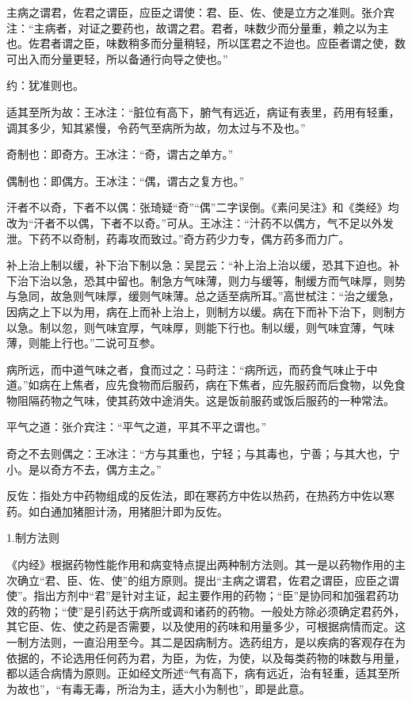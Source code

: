 \documentclass[draft,12pt]{ctexbook}
\begin{document}
\begin{jiaozhu}
	\item 主病之谓君，佐君之谓臣，应臣之谓使：君、臣、佐、使是立方之准则。张介宾注：“主病者，对证之要药也，故谓之君。君者，味数少而分量重，赖之以为主也。佐君者谓之臣，味数稍多而分量稍轻，所以匡君之不迨也。应臣者谓之使，数可出入而分量更轻，所以备通行向导之使也。”
	\item 约：犹准则也。
	\item 适其至所为故：王冰注：“脏位有高下，腑气有远近，病证有表里，药用有轻重，调其多少，知其紧慢，令药气至病所为故，勿太过与不及也。”
	\item 奇制也：即奇方。王冰注：“奇，谓古之单方。”
	\item 偶制也：即偶方。王冰注：“偶，谓古之复方也。”
	\item 汗者不以奇，下者不以偶：张琦疑“奇”“偶”二字误倒。《素问吴注》和《类经》均改为“汗者不以偶，下者不以奇。”可从。王冰注：“汁药不以偶方，气不足以外发泄。下药不以奇制，药毒攻而致过。”奇方药少力专，偶方药多而力广。
	\item 补上治上制以缓，补下治下制以急：吴昆云：“补上治上治以缓，恐其下迫也。补下治下治以急，恐其中留也。制急方气味薄，则力与缓等，制缓方而气味厚，则势与急同，故急则气味厚，缓则气味薄。总之适至病所耳。”高世栻注：“治之缓急，因病之上下以为用，病在上而补上治上，则制方以缓。病在下而补下治下，则制方以急。制以忽，则气味宜厚，气味厚，则能下行也。制以缓，则气味宜薄，气味薄，则能上行也。”二说可互参。
	\item 病所远，而中道气味之者，食而过之：马莳注：“病所远，而药食气味止于中道。”如病在上焦者，应先食物而后服药，病在下焦者，应先服药而后食物，以免食物阻隔药物之气味，使其药效中途消失。这是饭前服药或饭后服药的一种常法。
	\item 平气之道：张介宾注：“平气之道，平其不平之谓也。”
	\item 奇之不去则偶之：王冰注：“方与其重也，宁轻；与其毒也，宁善；与其大也，宁小。是以奇方不去，偶方主之。”
	\item 反佐：指处方中药物组成的反佐法，即在寒药方中佐以热药，在热药方中佐以寒药。如白通加猪胆计汤，用猪胆汁即为反佐。
\end{jiaozhu}


1.制方法则

《内经》根据药物性能作用和病变特点提出两种制方法则。其一是以药物作用的主次确立“君、臣、佐、使”的组方原则。提出“主病之谓君，佐君之谓臣，应臣之谓使”。指出方剂中“君”是针对主证，起主要作用的药物；“臣”是协同和加强君药功效的药物；“使”是引药达于病所或调和诸药的药物。一般处方除必须确定君药外，其它臣、佐、使之药是否需要，以及使用的药味和用量多少，可根据病情而定。这一制方法则，一直沿用至今。其二是因病制方。选药组方，是以疾病的客观存在为依据的，不论选用任何药为君，为臣，为佐，为使，以及每类药物的味数与用量，都以适合病情为原则。正如经文所述“气有高下，病有远近，治有轻重，适其至所为故也”，“有毒无毒，所治为主，适大小为制也”，即是此意。
\end{document}
